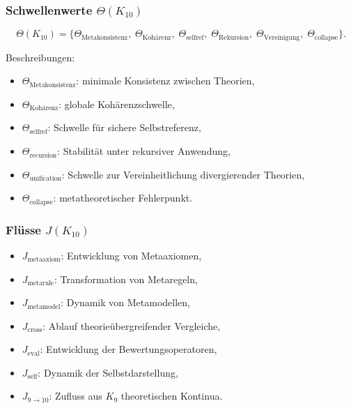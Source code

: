 \subsubsection{Schwellenwerte $\Theta(K_{10})$}

\[
\Theta(K_{10})=
\{
\Theta_{\mathrm{Metakonsistenz}},\;
\Theta_{\mathrm{Kohärenz}},\;
\Theta_{\mathrm{selfref}},\;
\Theta_{\mathrm{Rekursion}},\;
\Theta_{\mathrm{Vereinigung}},\;
\Theta_{\mathrm{collapse}}
\}.
\]

Beschreibungen:
\begin{itemize}
    \item $\Theta_{\mathrm{Metakonsistenz}}$: minimale Konsistenz zwischen Theorien,
    \item $\Theta_{\mathrm{Kohärenz}}$: globale Kohärenzschwelle,
    \item $\Theta_{\mathrm{selfref}}$: Schwelle für sichere Selbstreferenz,
    \item $\Theta_{\mathrm{recursion}}$: Stabilität unter rekursiver Anwendung,
    \item $\Theta_{\mathrm{unification}}$: Schwelle zur Vereinheitlichung divergierender Theorien,
    \item $\Theta_{\mathrm{collapse}}$: metatheoretischer Fehlerpunkt.
\end{itemize}

\subsubsection{Flüsse $J(K_{10})$}

\begin{itemize}
    \item $J_{\mathrm{metaaxiom}}$: Entwicklung von Metaaxiomen,
    \item $J_{\mathrm{metarule}}$: Transformation von Metaregeln,
    \item $J_{\mathrm{metamodel}}$: Dynamik von Metamodellen,
    \item $J_{\mathrm{cross}}$: Ablauf theorieübergreifender Vergleiche,
    \item $J_{\mathrm{eval}}$: Entwicklung der Bewertungsoperatoren,
    \item $J_{\mathrm{self}}$: Dynamik der Selbstdarstellung,
    \item $J_{9\to10}$: Zufluss aus $K_9$ theoretischen Kontinua.
\end{itemize}

